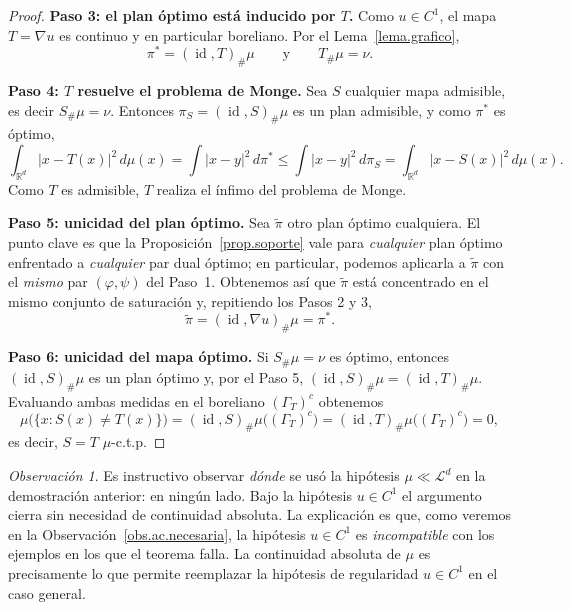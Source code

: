 \documentclass[12pt, a4paper]{amsbook}
\newcommand{\id}{\operatorname{id}}
\newcommand{\R}{{\mathbb R}}
\theoremstyle{remark}
\newtheorem{obs}[teo]{Observación}
\theoremstyle{definition}
\numberwithin{section}{chapter}
\numberwithin{subsection}{section}
\numberwithin{equation}{section}
\numberwithin{figure}{chapter}
\begin{document}
\begin{proof}
\medskip
\textbf{Paso 3: el plan óptimo está inducido por $T$.}
Como $u\in C^1$, el mapa $T=\nabla u$ es continuo y en particular boreliano.
Por el Lema~\ref{lema.grafico},
\[
\pi^*=(\id,T)_\#\mu
\qquad\text{y}\qquad
T_\#\mu=\nu.
\]

\medskip
\textbf{Paso 4: $T$ resuelve el problema de Monge.}
Sea $S$ cualquier mapa admisible, es decir $S_\#\mu=\nu$. Entonces
$\pi_S=(\id,S)_\#\mu$ es un plan admisible, y como $\pi^*$ es óptimo,
\[
\int_{\R^d}|x-T(x)|^2\,d\mu(x)
=
\int|x-y|^2\,d\pi^*
\leq
\int|x-y|^2\,d\pi_S
=
\int_{\R^d}|x-S(x)|^2\,d\mu(x).
\]
Como $T$ es admisible, $T$ realiza el ínfimo del problema de Monge.

\medskip
\textbf{Paso 5: unicidad del plan óptimo.}
Sea $\widetilde\pi$ otro plan óptimo cualquiera. El punto clave es que la
Proposición~\ref{prop.soporte} vale para \emph{cualquier} plan óptimo
enfrentado a \emph{cualquier} par dual óptimo; en particular, podemos aplicarla
a $\widetilde\pi$ con el \emph{mismo} par $(\varphi,\psi)$ del Paso~1. Obtenemos
así que $\widetilde\pi$ está concentrado en el mismo conjunto de saturación y,
repitiendo los Pasos 2 y 3,
\[
\widetilde\pi=(\id,\nabla u)_\#\mu=\pi^*.
\]

\medskip
\textbf{Paso 6: unicidad del mapa óptimo.}
Si $S_\#\mu=\nu$ es óptimo, entonces $(\id,S)_\#\mu$ es un plan óptimo y, por
el Paso 5, $(\id,S)_\#\mu=(\id,T)_\#\mu$. Evaluando ambas medidas en el
boreliano $(\Gamma_T)^c$ obtenemos
\[
\mu\bigl(\{x: S(x)\neq T(x)\}\bigr)
=
(\id,S)_\#\mu\bigl((\Gamma_T)^c\bigr)
=
(\id,T)_\#\mu\bigl((\Gamma_T)^c\bigr)
=
0,
\]
es decir, $S=T$ $\mu$-c.t.p.
\end{proof}

\begin{obs}\label{obs.C1.sin.ac}
Es instructivo observar \emph{dónde} se usó la hipótesis $\mu\ll\mathcal L^d$
en la demostración anterior: en ningún lado. Bajo la hipótesis $u\in C^1$ el
argumento cierra sin necesidad de continuidad absoluta. La explicación es
que, como veremos en la
Observación~\ref{obs.ac.necesaria}, la hipótesis $u\in C^1$ es
\emph{incompatible} con los ejemplos en los que el teorema falla. La
continuidad absoluta de $\mu$ es precisamente lo que permite reemplazar la
hipótesis de regularidad $u\in C^1$ en el caso general.
\end{obs}
\end{document}
